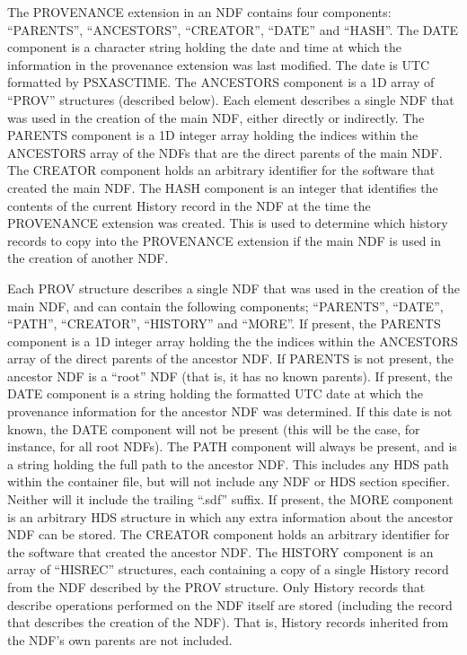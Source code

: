 \documentclass[twoside,11pt]{article}
\renewcommand{\_}{\texttt{\symbol{95}}}
\begin{document}
The PROVENANCE extension in an NDF contains four components: ``PARENTS'',
``ANCESTORS'', ``CREATOR'', ``DATE'' and ``HASH''. The DATE component is a
character string holding the date and time at which the information in
the provenance extension was last modified. The date is UTC formatted by
PSX\_ASCTIME. The ANCESTORS component is a 1D array of ``PROV'' structures
(described below). Each element describes a single NDF that was used in
the creation of the main NDF, either directly or indirectly. The PARENTS
component is a 1D integer array holding the indices within the ANCESTORS
array of the NDFs that are the direct parents of the main NDF. The
CREATOR component holds an arbitrary identifier for the software that
created the main NDF. The HASH component is an integer that identifies
the contents of the current History record in the NDF at the time the
PROVENANCE extension was created. This is used to determine which history
records to copy into the PROVENANCE extension if the main NDF is used in
the creation of another NDF.

Each PROV structure describes a single NDF that was used in the creation
of the main NDF, and can contain the following components; ``PARENTS'',
``DATE'', ``PATH'', ``CREATOR'', ``HISTORY'' and ``MORE''. If present, the PARENTS
component is a 1D integer array holding the the indices within the
ANCESTORS array of the direct parents of the ancestor NDF. If PARENTS is
not present, the ancestor NDF is a ``root'' NDF (that is, it has no known
parents). If present, the DATE component is a string holding the
formatted UTC date at which the provenance information for the ancestor
NDF was determined. If this date is not known, the DATE component will
not be present (this will be the case, for instance, for all root NDFs).
The PATH component will always be present, and is a string holding the
full path to the ancestor NDF. This includes any HDS path within the
container file, but will not include any NDF or HDS section specifier.
Neither will it include the trailing ``.sdf'' suffix. If present, the MORE
component is an arbitrary HDS structure in which any extra information
about the ancestor NDF can be stored. The CREATOR component holds an
arbitrary identifier for the software that created the ancestor NDF. The
HISTORY component is an array of ``HISREC'' structures, each containing a
copy of a single History record from the NDF described by the PROV
structure. Only History records that describe operations performed on the
NDF itself are stored (including the record that describes the creation
of the NDF). That is, History records inherited from the NDF's own
parents are not included.
\end{document}
